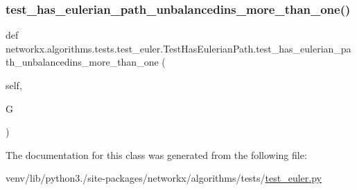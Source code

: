 \subsubsection{\texorpdfstring{test\+\_\+has\+\_\+eulerian\+\_\+path\+\_\+unbalancedins\+\_\+more\+\_\+than\+\_\+one()}{test\_has\_eulerian\_path\_unbalancedins\_more\_than\_one()}}
{\footnotesize\ttfamily def networkx.\+algorithms.\+tests.\+test\+\_\+euler.\+Test\+Has\+Eulerian\+Path.\+test\+\_\+has\+\_\+eulerian\+\_\+path\+\_\+unbalancedins\+\_\+more\+\_\+than\+\_\+one (\begin{DoxyParamCaption}\item[{}]{self,  }\item[{}]{G }\end{DoxyParamCaption})}



The documentation for this class was generated from the following file\+:\begin{DoxyCompactItemize}
\item 
venv/lib/python3./site-\/packages/networkx/algorithms/tests/\hyperlink{test__euler_8py}{test\+\_\+euler.\+py}\end{DoxyCompactItemize}
